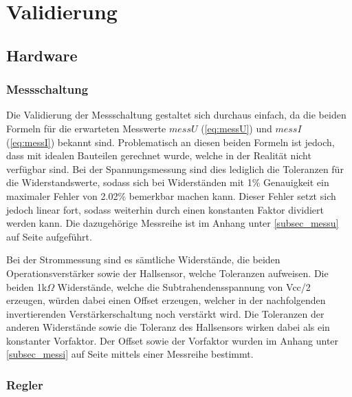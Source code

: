 \section{Validierung}

\subsection{Hardware}

\subsubsection{Messschaltung}
Die Validierung der Messschaltung gestaltet sich durchaus einfach, da die beiden Formeln für die erwarteten Messwerte $messU$ (\ref{eq:messU}) und $messI$ (\ref{eq:messI}) bekannt sind. Problematisch an diesen beiden Formeln ist jedoch, dass mit idealen Bauteilen gerechnet wurde, welche in der Realität nicht verfügbar sind. Bei der Spannungsmessung sind dies lediglich die Toleranzen für die Widerstandswerte, sodass sich bei Widerständen mit 1\% Genauigkeit ein maximaler Fehler von 2.02\% bemerkbar machen kann. Dieser Fehler setzt sich jedoch linear fort, sodass weiterhin durch einen konstanten Faktor dividiert werden kann. Die dazugehörige Messreihe ist im Anhang unter \ref{subsec_messu} auf Seite \pageref{subsec_messu} aufgeführt.

Bei der Strommessung sind es sämtliche Widerstände, die beiden Operationsverstärker sowie der Hallsensor, welche Toleranzen aufweisen. Die beiden 1k$\Omega$ Widerstände, welche die Subtrahendensspannung von Vcc/2 erzeugen, würden dabei einen Offset erzeugen, welcher in der nachfolgenden invertierenden Verstärkerschaltung noch verstärkt wird. Die Toleranzen der anderen Widerstände sowie die Toleranz des Hallsensors wirken dabei als ein konstanter Vorfaktor. Der Offset sowie der Vorfaktor wurden im Anhang unter \ref{subsec_messi} auf Seite \pageref{subsec_messi} mittels einer Messreihe bestimmt.

\subsubsection{Regler}
